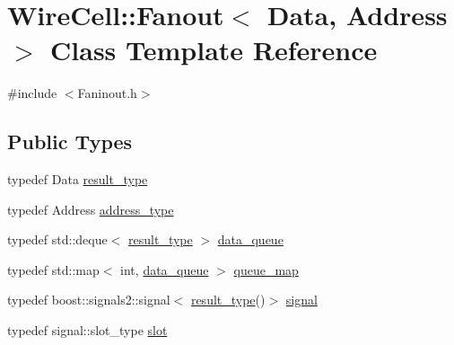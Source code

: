 \hypertarget{class_wire_cell_1_1_fanout}{}\section{Wire\+Cell\+:\+:Fanout$<$ Data, Address $>$ Class Template Reference}
\label{class_wire_cell_1_1_fanout}


{\ttfamily \#include $<$Faninout.\+h$>$}

\subsection*{Public Types}
\begin{DoxyCompactItemize}
\item 
typedef Data \hyperlink{class_wire_cell_1_1_fanout_ab2aa0c746557cf71d0454640c91ce0c5}{result\+\_\+type}
\item 
typedef Address \hyperlink{class_wire_cell_1_1_fanout_ab1b06d1a80be80055b2e76ca512294c5}{address\+\_\+type}
\item 
typedef std\+::deque$<$ \hyperlink{class_wire_cell_1_1_fanout_ab2aa0c746557cf71d0454640c91ce0c5}{result\+\_\+type} $>$ \hyperlink{class_wire_cell_1_1_fanout_aa4d6a2413f61c755cc749775651b5c49}{data\+\_\+queue}
\item 
typedef std\+::map$<$ int, \hyperlink{class_wire_cell_1_1_fanout_aa4d6a2413f61c755cc749775651b5c49}{data\+\_\+queue} $>$ \hyperlink{class_wire_cell_1_1_fanout_ad269356c60cd434e19c962907611e36d}{queue\+\_\+map}
\item 
typedef boost\+::signals2\+::signal$<$ \hyperlink{class_wire_cell_1_1_fanout_ab2aa0c746557cf71d0454640c91ce0c5}{result\+\_\+type}()$>$ \hyperlink{class_wire_cell_1_1_fanout_a776717aca6409f33b43c69b4770cd1dd}{signal}
\item 
typedef signal\+::slot\+\_\+type \hyperlink{class_wire_cell_1_1_fanout_aad9b77d911095ea21e611a806ee42d00}{slot}
\end{DoxyCompactItemize}
